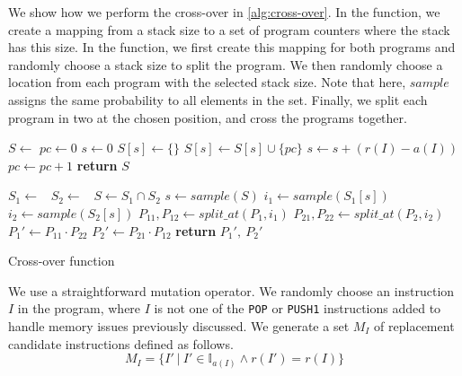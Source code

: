   We show how we perform the cross-over in \autoref{alg:cross-over}. In the  function, we create a mapping from a stack size to a set of program counters where the stack has this size. In the  function, we first create this mapping for both programs and randomly choose a stack size to split the program. We then randomly choose a location from each program with the selected stack size. Note that here, $sample$ assigns the same probability to all elements in the set. Finally, we split each program in two at the chosen position, and cross the programs together.

  \begin{algorithm}
    \begin{algorithmic}
      \State $S \gets $ 
      \State $pc \gets 0$
      \State $s \gets 0$
      \State $S[s] \gets \{\}$
      \EndIf
      \State $S[s] \gets S[s] \cup \{pc\}$
      \State $s \gets s + (r(I) - a(I))$
      \State $pc \gets pc + 1$
      \EndFor
      \State \textbf{return} $S$
      \EndFunction

      \State $S_1 \gets$~
      \State $S_2 \gets$~
      \State $S \gets S_1 \cap S_2$
      \State $s \gets sample(S)$
      \State $i_1 \gets sample(S_1[s])$
      \State $i_2 \gets sample(S_2[s])$
      \State $P_{11}, P_{12} \gets split\_at(P_1, i_1)$
      \State $P_{21}, P_{22} \gets split\_at(P_2, i_2)$
      \State $P_1' \gets P_{11}\cdot P_{22}$
      \State $P_2' \gets P_{21}\cdot P_{12}$
      \State \textbf{return} $P_1',~P_2'$
      \EndFunction
    \end{algorithmic}
    \caption{Cross-over function}
    \label{alg:cross-over}
  \end{algorithm}

  We use a straightforward mutation operator. We randomly choose an instruction $I$ in the program,  where $I$ is not one of the \lstinline{POP} or \lstinline{PUSH1} instructions added to handle memory issues previously discussed. We generate a set $M_I$ of replacement candidate instructions defined as follows.
  \begin{equation}
    \label{ref:mutation-set}
    M_I = \{ I'~|~I'\in \mathbb{I}_{a(I)}\land r(I') = r(I) \}
  \end{equation}

